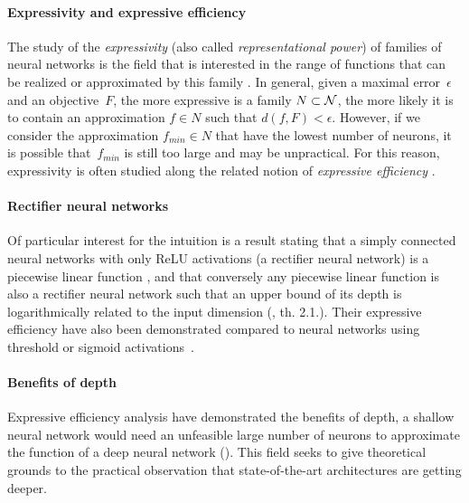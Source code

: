 \paragraph{Expressivity and expressive efficiency}
The study of the \emph{expressivity} (also called \emph{representational power}) of families of neural networks is the field that is interested in the range of functions that can be realized or approximated by this family \citep{haastad1991power,pascanu2013number}. In general, given a maximal error~$\epsilon$ and an objective~$F$, the more expressive is a family $N \subset \mathcal{N}$, the more likely it is to contain an approximation $f \in N$ such that $d(f,F) < \epsilon$. However, if we consider the approximation $f_{min} \in N$ that have the lowest number of neurons, it is possible that~$f_{min}$ is still too large and may be unpractical. For this reason, expressivity is often studied along the related notion of \emph{expressive efficiency} \citep{delalleau2011shallow,cohen2018boosting}.
\label{par:expr}

\paragraph{Rectifier neural networks}
Of particular interest for the intuition is a result stating that a simply connected neural networks with only ReLU activations (a rectifier neural network) is a piecewise linear function \citep{pascanu2013number,montufar2014number}, and that conversely any piecewise linear function is also a rectifier neural network such that an upper bound of its depth is logarithmically related to the input dimension (\cite{arora2018understanding}, th. 2.1.). Their expressive efficiency have also been demonstrated compared to neural networks using threshold or sigmoid activations~\citep{pan2016expressiveness}.

\paragraph{Benefits of depth}
Expressive efficiency analysis have demonstrated the benefits of depth, \ie a shallow neural network would need an unfeasible large number of neurons to approximate the function of a deep neural network (\eg \cite{delalleau2011shallow,bianchini2014complexity,poggio2015theory,eldan2016power,poole2016exponential,raghu2016expressive,cohen2016convolutional,mhaskar2016learning,lin2017does,arora2018understanding}). This field seeks to give theoretical grounds to the practical observation that state-of-the-art architectures are getting deeper. 

